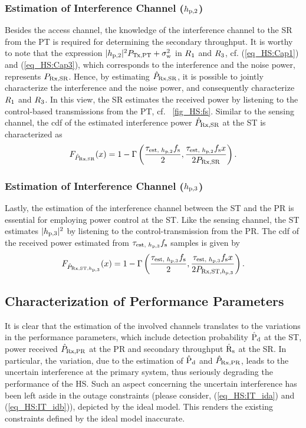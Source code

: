\subsubsection*{Estimation of Interference Channel ($h_{\text{p,2}}$)}
Besides the access channel, the knowledge of the interference channel to the SR from the PT is required for determining the secondary throughput. It is worthy to note that the expression $|h_{\text{p,2}}|^2 P_{\text{Tx,PT}} + \sigma^2_{\text{w}}$ in $R_{\text{1}}$ and $R_{\text{3}}$, cf. (\ref{eq_HS:Cap1}) and (\ref{eq_HS:Cap3}), which corresponds to the interference and the noise power, represents $P_{\text{Rx,SR}}$. Hence, by estimating $\hat{P}_{\text{Rx,SR}}$, it is possible to jointly characterize the interference and the noise power, and consequently characterize $R_{\text{1}}$ and $R_{\text{3}}$.  
In this view, the SR estimates the received power by listening to the control-based transmissions from the PT, cf. \figurename~\ref{fig_HS:fs}. Similar to the sensing channel, the cdf of the estimated interference power $\hat{P}_{\text{Rx,SR}}$ at the ST is characterized as
\begin{align}
F_{\hat{P}_{\text{Rx,SR}}}(x) = 1 - \Gamma \left( \frac{\tau_{\text{est, $h_{\text{p,2}}$}} f_{\text{s}}}{2}, \frac{\tau_{\text{est, $h_{\text{p,2}}$}} f_{\text{s}} x}{2 P_{\text{Rx,SR}}} \right) \label{eq_HS:fprcvdsr}.
\end{align}

  

\subsubsection*{Estimation of Interference Channel ($h_{\text{p,3}}$)}
Lastly, the estimation of the interference channel between the ST and the PR is essential for employing power control at the ST. Like the sensing channel, the ST estimates $|h_{\text{p,3}}|^2$ by listening to the control-transmission from the PR. The cdf of the received power estimated from $\tau_{\text{est, $h_{\text{p,3}}$}} f_{\text{s}}$ samples is given by  
\begin{align}
F_{\hat{P}_{\text{Rx,ST,$h_{\text{p,3}}$}}}(x) = 1 - \Gamma \left( \frac{\tau_{\text{est, $h_{\text{p,3}}$}} f_{\text{s}}}{2}, \frac{\tau_{\text{est, $h_{\text{p,3}}$}} f_{\text{s}} x}{2 P_{\text{Rx,ST,$h_{\text{p,3}}$}}} \right) \label{eq_HS:fprcvdstpr}.
\end{align}

\subsection{Characterization of Performance Parameters}
It is clear that the estimation of the involved channels translates to the variations in the performance parameters, which include detection probability $\hat{\text{P}}_{\text{d}}$ at the ST, power received $\hat{P}_{\text{Rx,PR}}$ at the PR and secondary throughput $\hat{\text{{R}}}_{\text{s}}$ at the SR. In particular, the variation, due to the estimation of $\hat{\text{P}}_{\text{d}}$ and $\hat{P}_{\text{Rx,PR}}$, leads to the uncertain interference at the primary system, thus seriously degrading the performance of the HS. Such an aspect concerning the uncertain interference has been left aside in the outage constraints (please consider, (\ref{eq_HS:IT_ida}) and (\ref{eq_HS:IT_idb})), depicted by the ideal model. This renders the existing constraints defined by the ideal model inaccurate. 

